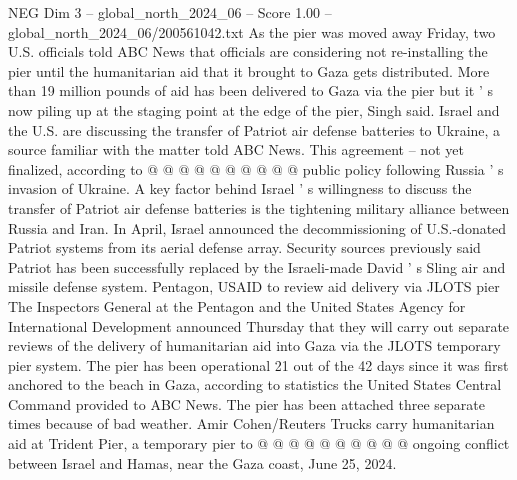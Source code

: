 \begin{textsample}{NEG Dim 3 – global\_north\_2024\_06 – Score 1.00 – global\_north\_2024\_06/200561042.txt}
As the pier was moved away Friday, two U.S. officials told ABC News that officials are considering not re-installing the pier until the humanitarian aid that it brought to Gaza gets distributed.
More than 19 million pounds of aid has been delivered to Gaza via the pier but it ' s now piling up at the staging point at the edge of the pier, Singh said.
Israel and the U.S. are discussing the transfer of Patriot air defense batteries to Ukraine, a source familiar with the matter told ABC News.
This agreement -- not yet finalized, according to @ @ @ @ @ @ @ @ @ @ public policy following Russia ' s invasion of Ukraine.
A key factor behind Israel ' s willingness to discuss the transfer of Patriot air defense batteries is the tightening military alliance between Russia and Iran.
In April, Israel announced the decommissioning of U.S.-donated Patriot systems from its aerial defense array.
Security sources previously said Patriot has been successfully replaced by the Israeli-made David ' s Sling air and missile defense system.
Pentagon, USAID to review aid delivery via JLOTS pier The Inspectors General at the Pentagon and the United States Agency for International Development announced Thursday that they will carry out separate reviews of the delivery of humanitarian aid into Gaza via the JLOTS temporary pier system.
The pier has been operational 21 out of the 42 days since it was first anchored to the beach in Gaza, according to statistics the United States Central Command provided to ABC News.
The pier has been attached three separate times because of bad weather.
Amir Cohen/Reuters Trucks carry humanitarian aid at Trident Pier, a temporary pier to @ @ @ @ @ @ @ @ @ @ ongoing conflict between Israel and Hamas, near the Gaza coast, June 25, 2024.

\end{textsample}
